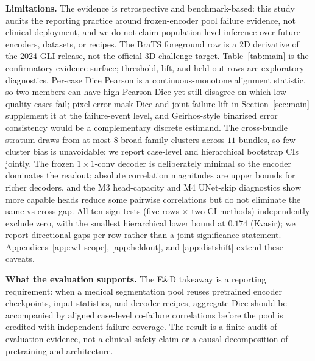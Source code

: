 \documentclass{article}
\begin{document}
\textbf{Limitations.} The evidence is retrospective and benchmark-based: this study audits the reporting practice around frozen-encoder pool failure evidence, not clinical deployment, and we do not claim population-level inference over future encoders, datasets, or recipes. The BraTS foreground row is a 2D derivative of the 2024 GLI release, not the official 3D challenge target. Table~\ref{tab:main} is the confirmatory evidence surface; threshold, lift, and held-out rows are exploratory diagnostics. Per-case Dice Pearson is a continuous-monotone alignment statistic, so two members can have high Pearson Dice yet still disagree on which low-quality cases fail; pixel error-mask Dice and joint-failure lift in Section~\ref{sec:main} supplement it at the failure-event level, and Geirhos-style binarised error consistency would be a complementary discrete estimand. The cross-bundle stratum draws from at most $8$ broad family clusters across $11$ bundles, so few-cluster bias is unavoidable; we report case-level and hierarchical bootstrap CIs jointly. The frozen $1{\times}1$-conv decoder is deliberately minimal so the encoder dominates the readout; absolute correlation magnitudes are upper bounds for richer decoders, and the M3 head-capacity and M4 UNet-skip diagnostics show more capable heads reduce some pairwise correlations but do not eliminate the same-vs-cross gap. All ten sign tests (five rows $\times$ two CI methods) independently exclude zero, with the smallest hierarchical lower bound at $0.174$ (Kvasir); we report directional gaps per row rather than a joint significance statement. Appendices~\ref{app:w1-scope}, \ref{app:heldout}, and \ref{app:distshift} extend these caveats.

\textbf{What the evaluation supports.} The E\&D takeaway is a reporting requirement: when a medical segmentation pool reuses pretrained encoder checkpoints, input statistics, and decoder recipes, aggregate Dice should be accompanied by aligned case-level co-failure correlations before the pool is credited with independent failure coverage. The result is a finite audit of evaluation evidence, not a clinical safety claim or a causal decomposition of pretraining and architecture.
\end{document}
